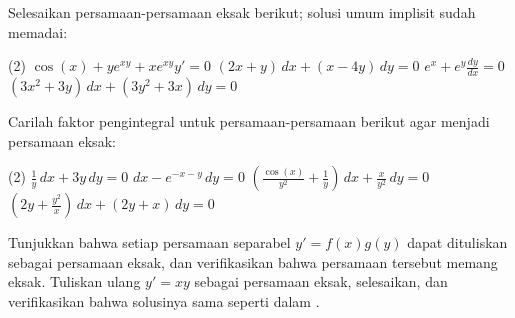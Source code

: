 \setcounter{exercise}{100}

\begin{exercise}
Selesaikan persamaan-persamaan eksak berikut; solusi umum implisit
sudah memadai:
\begin{tasks}(2)
\task
$\cos(x)+ye^{xy} + xe^{xy} y' = 0$
\task
$(2x+y)\, dx + (x-4y) \, dy = 0$
\task
$e^x + e^y \frac{dy}{dx} = 0$
\task
$(3x^2+3y)\,dx + (3y^2+3x)\, dy = 0$
\end{tasks}
\end{exercise}

\begin{samepage}
\begin{exercise}
Carilah faktor pengintegral untuk persamaan-persamaan berikut agar menjadi
persamaan eksak:
\begin{tasks}(2)
\task
$\frac{1}{y}\, dx + 3y \, dy = 0$
\task
$dx - e^{-x-y} \, dy = 0$
\task
$\left( \frac{\cos(x)}{y^2} + \frac{1}{y} \right) \, dx + \frac{x}{y^2} \, dy = 0$
\task
$\left( 2y + \frac{y^2}{x} \right) \, dx + ( 2y+x )\, dy = 0$
\end{tasks}
\end{exercise}
\end{samepage}

\begin{exercise}
\leavevmode
\begin{tasks}
\task
Tunjukkan bahwa setiap
persamaan separabel $y' = f(x)g(y)$ dapat dituliskan sebagai persamaan eksak,
dan verifikasikan bahwa persamaan tersebut memang eksak.
\task Tuliskan ulang $y' = xy$ sebagai persamaan eksak, selesaikan, dan verifikasikan
bahwa solusinya sama seperti dalam .
\end{tasks}
\end{exercise}

